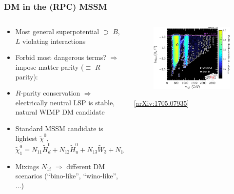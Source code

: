 \documentclass[10pt,aspectratio=169]{beamer}
\newcommand*\widefbox[1]{\fbox{\hspace{0.5em}#1\hspace{0.5em}}}
\begin{document}
\begin{frame}
  \frametitle{DM in the (RPC) MSSM}
  \begin{columns}[t]
    \begin{column}{0.5\textwidth}
  \begin{itemize} \itemsep1em
    \item Most general superpotential $\supset$ \alert{$B$, $L$ violating
      interactions}
    \item Forbid most dangerous terms? $\Rightarrow$
      impose matter parity ($\equiv$ $R$-parity):
    \item $R$-parity conservation $\Rightarrow$ electrically neutral
      LSP is stable, natural WIMP DM candidate
    \item Standard MSSM candidate is lightest $\tilde{\chi}^0$,
      \begin{equation*}
        \tilde{\chi}_1^0 = N_{11} \tilde{H}_d^0 + N_{12} \tilde{H}_u^0
        + N_{13} \tilde{W}_3 + N_{14} \tilde{B}
      \end{equation*}
    \item Mixings $N_{1i}$ $\Rightarrow$ different DM scenarios
      (``bino-like'', ``wino-like'', $\ldots$)
  \end{itemize}
    \end{column}
    \begin{column}{0.5\textwidth}
      \begin{figure}
        \includegraphics[width=\textwidth]{gambit_cmssm_mchi0_omega}
      \end{figure}
      \begin{center}
        \tiny [\href{http://arxiv.org/abs/1705.07935}{arXiv:1705.07935}]
      \end{center}
    \end{column}
    \end{columns}
\end{frame}
\end{document}
